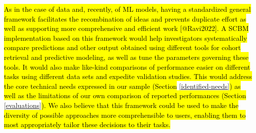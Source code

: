 \documentclass[sn-mathphys,Numbered,pdflatex]{sn-jnl}
\theoremstyle{remark}
\theoremstyle{definition}
\begin{document}
\hl{As in the case of data and, recently, of ML models, having a standardized general framework facilitates the recombination of ideas and prevents duplicate effort as well as supporting more comprehensive and efficient work [@Ravi2022]. A SCBM implementation based on this framework would help investigators systematically compare predictions and other output obtained using different tools for cohort retrieval and predictive modeling, as well as tune the parameters governing these tools. It would also make like-kind comparisons of performance easier on different tasks using different data sets and expedite validation studies. This would address the core technical needs expressed in our sample (Section }\ref{identified-needs}\hl{) as well as the limitations of our own comparison of reported performances (Section }\ref{evaluations}\hl{).
We also believe that this framework could be used to make the diversity of possible approaches more comprehensible to users, enabling them to most appropriately tailor these decisions to their tasks.}

\small
\end{document}
